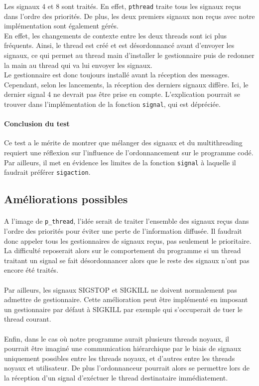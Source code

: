 Les signaux 4 et 8 sont traités. En effet, \texttt{pthread} traite tous les signaux reçus dans l'ordre des priorités. De plus, les deux premiers signaux non reçus avec notre implémentation sont également gérés. \\
En effet, les changements de contexte entre les deux threads sont ici plus fréquents. Ainsi, le thread est créé et est désordonnancé avant d'envoyer les signaux, ce qui permet au thread main d'installer le gestionnaire puis de redonner la main au thread qui va lui envoyer les signaux. \\
Le gestionnaire est donc toujours installé avant la réception des messages. Cependant, selon les lancements, la réception des derniers signaux diffère. Ici, le dernier signal 4 ne devrait pas être prise en compte. L'explication pourrait se trouver dans l'implémentation de la fonction \texttt{signal}, qui est dépréciée. 

\paragraph{Conclusion du test}
Ce test a le mérite de montrer que mélanger des signaux et du multithreading requiert une réflexion sur l'influence de l'ordonnancement sur le programme codé. Par ailleurs, il met en évidence les limites de la fonction \texttt{signal} à laquelle il faudrait préférer \texttt{sigaction}.%

\subsection{Améliorations possibles}

\paragraph{}
A l'image de \texttt{p\_thread}, l'idée serait de traiter l'ensemble des signaux reçus dans l'ordre des priorités pour éviter une perte de l'information diffusée. Il faudrait donc appeler tous les gestionnaires de signaux reçus, pas seulement le prioritaire. La difficulté reposerait alors sur le comportement du programme si un thread traitant un signal se fait désordonnancer alors que le reste des signaux n'ont pas encore été traités.

\paragraph{}
Par ailleurs, les signaux SIGSTOP et SIGKILL ne doivent normalement pas admettre de gestionnaire. Cette amélioration peut être implémenté en imposant un gestionnaire par défaut à SIGKILL par exemple qui s'occuperait de tuer le thread courant. 

\paragraph{}
Enfin, dans le cas où notre programme aurait plusieurs threads noyaux, il pourrait être imaginé une communication hiérarchique par le biais de signaux uniquement possibles entre les threads noyaux, et d'autres entre les threads noyaux et utilisateur. De plus l'ordonnanceur pourrait alors se permettre lors de la réception d'un signal d'exéctuer le thread destinataire immédiatement.